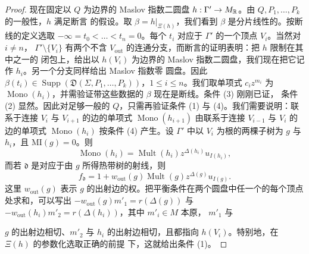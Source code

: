 \begin{proof}

现在固定以 $Q$ 为边界的 Maslov 指数二圆盘 $h : \Gamma'\to M_{\mathbb{R}}$。由 $Q,P_1,\dots,P_k$ 的一般性，$h$ 满足断言
的假设。取 $\beta = h|_{\Xi(h)}$，我们看到 $\beta$ 是分片线性的。按断线的定义选取
$-\infty = t_0<\dots<t_n = 0$。每个 $t_i$ 对应于 $\Gamma'$ 的一个顶点 $V_i$。当然对 $i\ne n$，
$\Gamma'\setminus\{V_i\}$ 有两个不含 $V_{\mathrm{out}}$ 的连通分支，而断言的证明表明：把 $h$ 限制在其中之一的
闭包上，给出以 $h(V_i)$ 为边界的 Maslov 指数二圆盘，我们现在把它记作 $h_i$。另一个分支同样给出 Maslov 指数零
圆盘。因此 $\beta(t_i)\in\operatorname{Supp}(\mathfrak D(\Sigma,P_1,\dots,P_k))$，$1\le i\le n$。我们取单项式
$c_iz^{m_i}$ 为 $\operatorname{Mono}(h_i)$，并需验证带这些数据的 $\beta$ 现在是断线。条件 (3) 刚刚已证，
条件 (2) 显然。因此对足够一般的 $Q$，只需再验证条件 (1) 与 (4)。我们需要说明：联系于连接 $V_i$ 与
$V_{i+1}$ 的边的单项式 $\operatorname{Mono}(h_{i+1})$ 由联系于连接 $V_{i-1}$ 与 $V_i$ 的边的单项式
$\operatorname{Mono}(h_i)$ 按条件 (4) 产生。设 $\Gamma'$ 中以 $V_i$ 为根的两棵子树为 $g$ 与 $h_i$，且
$\mathrm{MI}(g)=0$。则
\[
\operatorname{Mono}(h_i) = \operatorname{Mult}(h_i)z^{\Delta(h_i)}u_{I(h_i)},
\]
而若 $\mathfrak d$ 是对应于由 $g$ 所得热带树的射线，则
\[
f_{\mathfrak d} = 1+w_{\mathrm{out}}(g)\operatorname{Mult}(g)z^{\Delta(g)}u_{I(g)}.
\]
这里 $w_{\mathrm{out}}(g)$ 表示 $g$ 的出射边的权。把平衡条件在两个圆盘中任一个的每个顶点处求和，可以写出
$-w_{\mathrm{out}}(g)m'_1 = r(\Delta(g))$ 与 $-w_{\mathrm{out}}(h_i)m'_2 = r(\Delta(h_i))$，其中 $m'_i\in M$ 本原，
$m'_1$ 与

$g$ 的出射边相切、$m'_2$ 与 $h_i$ 的出射边相切，且都指向 $h(V_i)$。特别地，在 $\Xi(h)$ 的参数化选取正确的前提
下，这就给出条件 (1)。


\end{proof}
